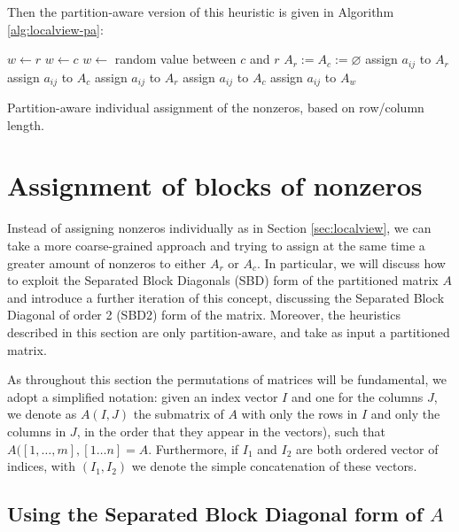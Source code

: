 Then the partition-aware version of this heuristic is given in Algorithm \ref{alg:localview-pa}:

\begin{algorithm}[h]
	\begin{algorithmic}
		\State
		\State $w \gets r$ 
		\State $w \gets c$
		\Else
		\State $w \gets$ random value between $c$ and $r$
		\EndIf
		\State $A_r := A_c := \varnothing$
		\State assign $a_{ij}$ to $A_r$
		\State assign $a_{ij}$ to $A_c$
		\Else
		\State assign $a_{ij}$ to $A_r$
		\State assign $a_{ij}$ to $A_c$
		\Else
		\State assign $a_{ij}$ to $A_w$
		\EndIf
		\EndIf
		\EndFor
	\end{algorithmic}
	\caption{Partition-aware individual assignment of the nonzeros, based on row/column length.} \label{alg:localview-pa}
\end{algorithm}

\section{Assignment of blocks of nonzeros} \label{sec:sbd}

Instead of assigning nonzeros individually as in Section \ref{sec:localview}, we can take a more coarse-grained approach and trying to assign at the same time a greater amount of nonzeros to either $A_r$ or $A_c$. In particular, we will discuss how to exploit the Separated Block Diagonals (SBD) form of the partitioned matrix $A$ and introduce a further iteration of this concept, discussing the Separated Block Diagonal of order 2 (SBD2) form of the matrix. Moreover, the heuristics described in this section are only partition-aware, and take as input a partitioned matrix.

As throughout this section the permutations of matrices will be fundamental, we adopt a simplified notation: given an index vector $I$ and one for the columns $J$, we denote as $A(I,J)$ the submatrix of $A$ with only the rows in $I$ and only the columns in $J$, in the order that they appear in the vectors), such that $A([1,\dots,m],[1 \dots n] = A$. Furthermore, if $I_1$ and $I_2$ are both ordered vector of indices, with $(I_1,I_2)$ we denote the simple concatenation of these vectors.

\subsection{Using the Separated Block Diagonal form of $A$}

